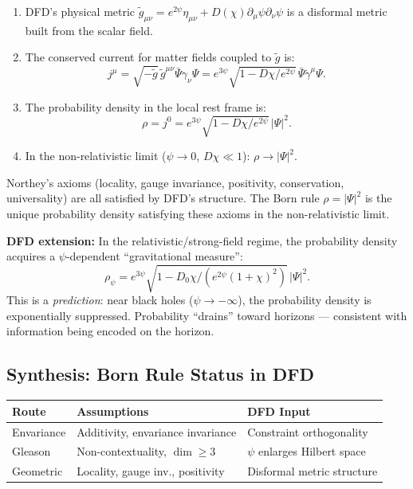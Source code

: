 \documentclass[11pt,a4paper]{article}
\begin{document}
\begin{enumerate}
\item DFD's physical metric $\tilde{g}_{\mu\nu} = e^{2\psi}\eta_{\mu\nu} + D(\chi)\partial_\mu\psi\partial_\nu\psi$ is a disformal metric built from the scalar field.
\item The conserved current for matter fields coupled to $\tilde{g}$ is:
\begin{equation}
j^\mu = \sqrt{-\tilde{g}}\,\tilde{g}^{\mu\nu}\bar\Psi\gamma_\nu\Psi = e^{3\psi}\sqrt{1-D\chi/e^{2\psi}}\,\bar\Psi\tilde\gamma^\mu\Psi.
\end{equation}
\item The probability density in the local rest frame is:
\begin{equation}
\rho = j^0 = e^{3\psi}\sqrt{1-D\chi/e^{2\psi}}\,|\Psi|^2.
\end{equation}
\item In the non-relativistic limit ($\psi \to 0$, $D\chi \ll 1$): $\rho \to |\Psi|^2$.
\end{enumerate}

Northey's axioms (locality, gauge invariance, positivity, conservation, universality) are all satisfied by DFD's structure. The Born rule $\rho = |\Psi|^2$ is the unique probability density satisfying these axioms in the non-relativistic limit.

\textbf{DFD extension:} In the relativistic/strong-field regime, the probability density acquires a $\psi$-dependent ``gravitational measure'':
\begin{equation}\label{eq:grav-measure}
\boxed{\rho_\psi = e^{3\psi}\sqrt{1-D_0\chi/(e^{2\psi}(1+\chi)^2)}\,|\Psi|^2.}
\end{equation}
This is a \emph{prediction}: near black holes ($\psi \to -\infty$), the probability density is exponentially suppressed. Probability ``drains'' toward horizons --- consistent with information being encoded on the horizon.

\subsection{Synthesis: Born Rule Status in DFD}

\begin{center}
\begin{tabular}{lll}
\toprule
\textbf{Route} & \textbf{Assumptions} & \textbf{DFD Input} \\
\midrule
Envariance & Additivity, envariance invariance & Constraint orthogonality \\
Gleason & Non-contextuality, $\dim \geq 3$ & $\psi$ enlarges Hilbert space \\
Geometric & Locality, gauge inv., positivity & Disformal metric structure \\
\bottomrule
\end{tabular}
\end{center}
\end{document}
